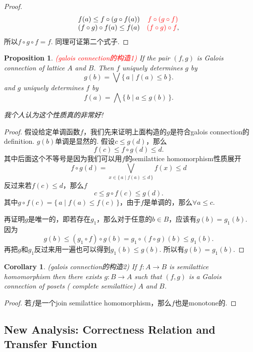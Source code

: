 \documentclass{article}
\newtheorem{corollary}[theorem]{Corollary}
\newtheorem{proposition}[theorem]{Proposition}
\newcommand*{\xfunc}[4]{{#2}\colon{#3}{#1}{#4}}
\newcommand*{\func}[3]{\xfunc{\to}{#1}{#2}{#3}}
\newcommand\Set[2]{\{\,#1\mid#2\,\}} %
\newcommand{\redt}[1]{\textcolor{red}{#1}}
\begin{document}
\begin{proof}
$$
\begin{array}{cc}
 f(a) \leq  f \circ (g \circ f(a)) & {\color{red} f \circ( g \circ f)} \\
 (f\circ g) \circ f(a) \leq f(a) & {\color{red}(f \circ g) \circ f}, \\
\end{array}
$$
所以$f \circ g \circ f  = f$. 同理可证第二个式子.
\end{proof}

\begin{proposition}
\rm \redt{(galois connection的构造1)} If the pair $(f,g)$ is Galois connection of lattice $A$ and $B$. Then $f$ uniquely determines $g$ by
$$
g(b) = \bigvee\Set{a}{f(a) \leq b}.
$$
and $g$ uniquely determines $f$ by
$$
f(a) = \bigwedge\Set{b}{a \leq g(b)}.
$$

{\color{blue} 我个人认为这个性质真的非常好}!
\end{proposition}


\begin{proof}
假设给定单调函数$f$，我们先来证明上面构造的$g$是符合galois connection的definition. $g(b)$单调是显然的. 假设$c \leq g(d)$，那么
$$
f(c) \leq f \circ g (d) \leq d.  
$$
其中后面这个不等号是因为我们可以用$f$的semilattice homomorphism性质展开
$$
f \circ g (d) = \bigvee_{x \in \Set{a}{f(a) \leq d}}f(x) \leq d  
$$
反过来若$f(c) \leq d$，那么$f$
$$
c \leq g \circ f(c) \leq g(d).
$$
其中$g \circ f(c) = \Set{a}{f(a) \leq f(c)}$，由于$f$是单调的，那么$\forall a \leq c$. 

再证明$g$是唯一的，即若存在$g_1$，那么对于任意的$b \in B$，应该有$g(b) = g_1(b)$. 因为
$$
g(b) \leq (g_1\circ f)\circ g(b) = g_1 \circ (f \circ g)(b) \leq g_1(b). 
$$
再把$g$和$g_1$反过来用一遍也可以得到$g_1(b) \leq g(b)$. 所以有$g(b) = g_1(b)$. 
\end{proof}

\begin{corollary}
\rm {\color{red} (galois connection的构造2)} If $\func{f}{A}{B}$ is semilattice homomorphism then there exists $\func{g}{B}{A}$ such that $(f,g)$ is a Galois connection of posets ({\color{red} complete semilattice}) $A$ and $B$.
\end{corollary}

\begin{proof}
若$f$是一个join semilattice homomorphism，那么$f$也是monotone的. 
\end{proof}

\newpage
\subsection{New Analysis: Correctness Relation and Transfer Function}
\end{document}
